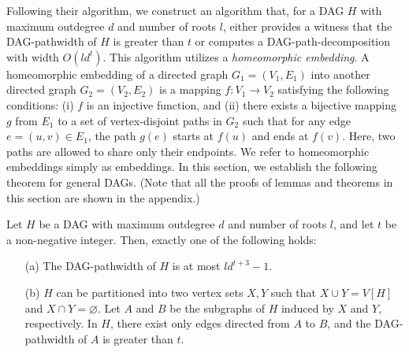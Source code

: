 \documentclass[runningheads]{llncs}
\theoremstyle{plain}
\theoremstyle{definition}
\begin{document}
Following their algorithm, we construct an algorithm that, for a DAG $H$ with maximum outdegree $d$ and number of roots $l$, either provides a witness that the DAG-pathwidth of $H$ is greater than $t$ or computes a DAG-path-decomposition with width $O(ld^t)$. This algorithm utilizes a \emph{homeomorphic embedding}. A homeomorphic embedding of a directed graph $G_1 = (V_1, E_1)$ into another directed graph $G_2 = (V_2, E_2)$ is a mapping $f: V_1 \rightarrow V_2$ satisfying the following conditions: (i) $f$ is an injective function, and (ii) there exists a bijective mapping $g$ from $E_1$ to a set of vertex-disjoint paths in $G_2$ such that for any edge $e = (u, v) \in E_1$, the path $g(e)$ starts at $f(u)$ and ends at $f(v)$.
Here, two paths are allowed to share only their endpoints. We refer to homeomorphic embeddings simply as embeddings. In this section, we establish the following theorem for general DAGs.
(Note that all the proofs of lemmas and theorems in this section are shown in the appendix.)

\begin{theorem}\label{approximation3}
    Let $H$ be a DAG with maximum outdegree $d$ and number of roots $l$, and let $t$ be a non-negative integer. Then, exactly one of the following holds:
    \begin{enumerate}
        \item[(a)] The DAG-pathwidth of $H$ is at most $ld^{t+3}-1$.
        \item[(b)] $H$ can be partitioned into two vertex sets $X, Y$ such that $X \cup Y = V[H]$ and $X \cap Y = \varnothing$. Let $A$ and $B$ be the subgraphs of $H$ induced by $X$ and $Y$, respectively. In $H$, there exist only edges directed from $A$ to $B$, and the DAG-pathwidth of $A$ is greater than $t$.
    
    \end{enumerate}
\end{theorem}
\end{document}
